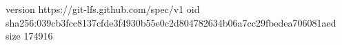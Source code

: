 version https://git-lfs.github.com/spec/v1
oid sha256:039cb3fcc8137cfde3f4930b55e0c2d804782634b06a7cc29fbedea706081aed
size 174916
